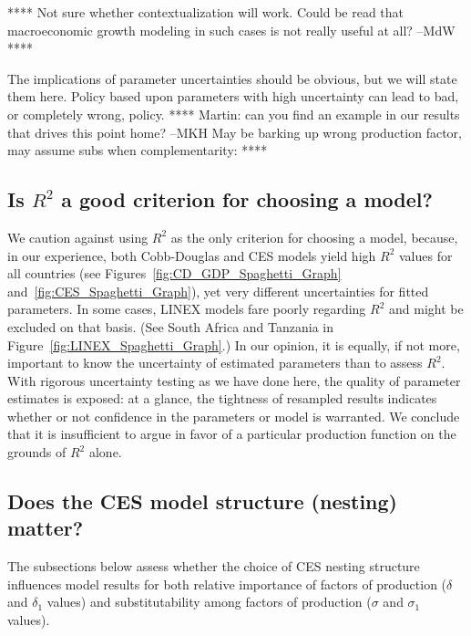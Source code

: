 \documentclass[preprint,authoryear,12pt]{elsarticle}\usepackage[]{graphicx}\usepackage[]{color}
\begin{document}
**** Not sure whether contextualization will work. 
Could be read that macroeconomic growth modeling in such cases is not really useful at all? 
--MdW ****

The implications of parameter uncertainties should be obvious, 
but we will state them here. 
Policy based upon parameters with high uncertainty can lead to bad, or completely wrong, policy. 
**** Martin: can you find an example in our results that drives this point home? --MKH  
May be barking up wrong production factor, may assume subs when complementarity: ****


\subsection{Is $R^2$ a good criterion for choosing a model?} 
\label{sec:is_r2_good}

We caution against using $R^2$ as the only criterion for choosing a model, 
because, in our experience, 
both Cobb-Douglas and CES models yield high $R^2$ values for all countries 
(see Figures~\ref{fig:CD_GDP_Spaghetti_Graph} and~\ref{fig:CES_Spaghetti_Graph}), yet
very different uncertainties for fitted parameters.
In some cases, LINEX models fare poorly regarding $R^2$ and might be excluded on that basis. 
(See South Africa and Tanzania in Figure~\ref{fig:LINEX_Spaghetti_Graph}.) 
In our opinion, 
it is equally, if not more, important to know the uncertainty 
of estimated parameters than to assess $R^2$.
With rigorous uncertainty testing as we have done here, 
the quality of parameter estimates is exposed: 
at a glance, the tightness of resampled results indicates 
whether or not confidence in the parameters or model is warranted. 
We conclude that it is insufficient to argue 
in favor of a particular production function 
on the grounds of $R^2$ alone.


\subsection{Does the CES model structure (nesting) matter?} 
\label{sec:nest_matter}

The subsections below assess whether the choice of CES nesting structure 
influences model results for both 
relative importance of factors of production ($\delta$ and $\delta_1$ values) and 
substitutability among factors of production ($\sigma$ and $\sigma_1$ values). 
\end{document}
